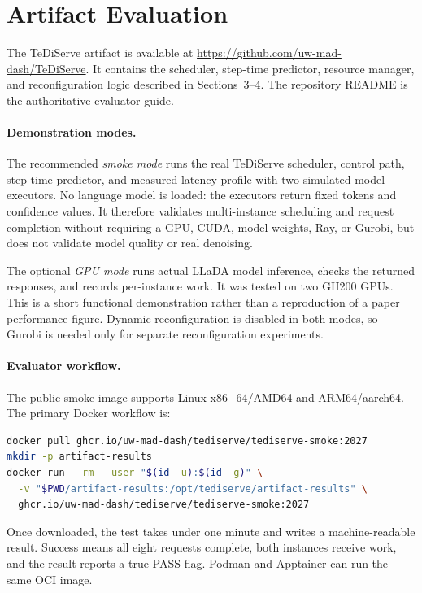 \section{Artifact Evaluation}
\label{sec:artifact-evaluation}

The TeDiServe artifact is available at
\url{https://github.com/uw-mad-dash/TeDiServe}. It contains the scheduler,
step-time predictor, resource manager, and reconfiguration logic described in
Sections~3--4. The repository README is the authoritative evaluator guide.

\paragraph{Demonstration modes.}
The recommended \emph{smoke mode} runs the real TeDiServe scheduler, control
path, step-time predictor, and measured latency profile with two simulated
model executors. No language model is loaded: the executors return fixed tokens
and confidence values. It therefore validates multi-instance scheduling and
request completion without requiring a GPU, CUDA, model weights, Ray, or
Gurobi, but does not validate model quality or real denoising.

The optional \emph{GPU mode} runs actual LLaDA model inference, checks
the returned responses, and records per-instance work. It was tested on two
GH200 GPUs. This is a short functional demonstration rather than a reproduction
of a paper performance figure. Dynamic reconfiguration is disabled in both
modes, so Gurobi is needed only for separate reconfiguration experiments.

\paragraph{Evaluator workflow.}
The public smoke image supports Linux x86\_64/AMD64 and ARM64/aarch64. The
primary Docker workflow is:

\begin{lstlisting}[language=bash]
docker pull ghcr.io/uw-mad-dash/tediserve/tediserve-smoke:2027
mkdir -p artifact-results
docker run --rm --user "$(id -u):$(id -g)" \
  -v "$PWD/artifact-results:/opt/tediserve/artifact-results" \
  ghcr.io/uw-mad-dash/tediserve/tediserve-smoke:2027
\end{lstlisting}

Once downloaded, the test takes under one minute and writes a machine-readable
result. Success means all eight requests complete, both instances receive
work, and the result reports a true PASS flag. Podman and Apptainer can run the
same OCI image.

